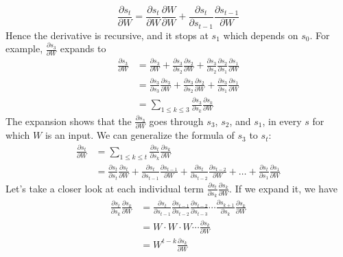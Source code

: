 \documentclass{article}
\begin{document}
\begin{equation}
    \frac{\partial s_t}{\partial W} = \frac{\partial s_t}{\partial W}\frac{\partial W}{\partial W}  + \frac{\partial s_t}{\partial s_{t-1}}\frac{\partial s_{t-1}}{\partial W}   
\end{equation}
Hence the derivative is recursive, and it stops at $s_1$ which depends on $s_0$. For example, $\frac{\partial s_3}{\partial W}$ expands to 
\begin{align}
    \frac{\partial s_3}{\partial W} &= \frac{\partial s_3}{\partial W} + \frac{\partial s_3}{\partial s_2}\frac{\partial s_2}{\partial W} + \frac{\partial s_3}{\partial s_2}\frac{\partial s_2}{\partial s_1}\frac{\partial s_1}{\partial W}\\
    &= \frac{\partial s_3}{\partial s_3}\frac{\partial s_3}{\partial W} + \frac{\partial s_3}{\partial s_2}\frac{\partial s_2}{\partial W} + \frac{\partial s_3}{\partial s_1}\frac{\partial s_1}{\partial W} \\
    &= \sum_{1\leq k \leq 3}\frac{\partial s_3}{\partial s_k}\frac{\partial s_k}{\partial W}
\end{align}
The expansion shows that the $\frac{\partial s_3}{\partial W}$ goes through $s_3$, $s_2$, and $s_1$, in every $s$ for which $W$ is an input. We can generalize the formula of $s_3$ to $s_t$:
\begin{align}
    \frac{\partial s_t}{\partial W} &= \sum_{1\leq k \leq t}\frac{\partial s_t}{\partial s_k}\frac{\partial s_k}{\partial W} \label{eq-dw_sum1}\\
    &= \frac{\partial s_t}{\partial s_t}\frac{\partial s_t}{\partial W} + \frac{\partial s_t}{\partial s_{t-1}}\frac{\partial s_{t-1}}{\partial W} + \frac{\partial s_t}{\partial s_{t-2}}\frac{\partial s_{t-2}}{\partial W} + \dots +  \frac{\partial s_t}{\partial s_1}\frac{\partial s_1}{\partial W}
\end{align}
Let's take a closer look at each individual term $\frac{\partial s_t}{\partial s_k}\frac{\partial s_k}{\partial W}$. If we expand it, we have
\begin{align}
    \frac{\partial s_t}{\partial s_k}\frac{\partial s_k}{\partial W} &= \frac{\partial s_t}{\partial s_{t-1}}\frac{\partial s_{t-1}}{\partial s_{t-2}}\frac{\partial s_{t-2}}{\partial s_{t-3}}\cdots\frac{\partial s_{k+1}}{\partial s_k}\frac{\partial s_k}{\partial W} \\
    &= W\cdot W\cdot W\cdots \frac{\partial s_k}{\partial W} \\
    &= W^{t - k}\frac{\partial s_k}{\partial W}
\end{align}
\end{document}
